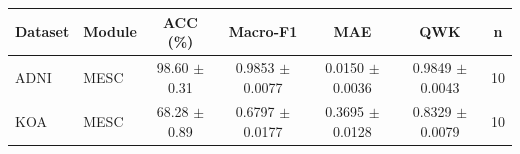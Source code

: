 \begin{tabular}{llccccc}
\toprule
Dataset & Module & ACC (\%) & Macro-F1 & MAE & QWK & n \\
\midrule
ADNI & MESC & 98.60 $\pm$ 0.31 & 0.9853 $\pm$ 0.0077 & 0.0150 $\pm$ 0.0036 & 0.9849 $\pm$ 0.0043 & 10 \\
KOA & MESC & 68.28 $\pm$ 0.89 & 0.6797 $\pm$ 0.0177 & 0.3695 $\pm$ 0.0128 & 0.8329 $\pm$ 0.0079 & 10 \\
\bottomrule
\end{tabular}
